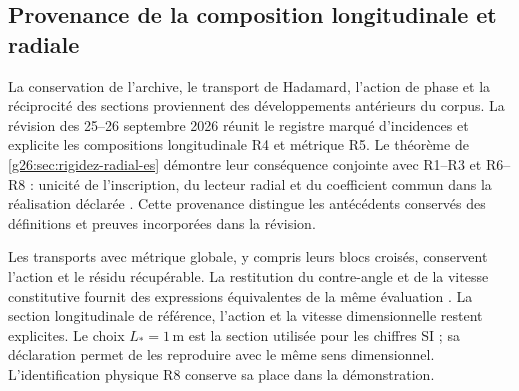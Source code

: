 \subsection{Provenance de la composition longitudinale et radiale}

La conservation de l’archive, le transport de Hadamard, l’action de
phase et la réciprocité des sections proviennent des développements
antérieurs du corpus. La révision des 25--26 septembre 2026
réunit le registre marqué d’incidences et explicite les compositions
longitudinale R4 et métrique R5. Le théorème de
\ref{g26:sec:rigidez-radial-es} démontre leur conséquence conjointe avec
R1--R3 et R6--R8 : unicité de l’inscription, du lecteur radial et du
coefficient commun dans la réalisation déclarée \cite{hmtg26radial}.
Cette provenance distingue les antécédents conservés des
définitions et preuves incorporées dans la révision.

Les transports avec métrique globale, y compris leurs blocs croisés,
conservent l’action et le résidu récupérable. La restitution du
contre-angle et de la vitesse constitutive fournit des expressions
équivalentes de la même évaluation \cite{hmtg26metric,hmtg26counter}.
La section longitudinale de référence, l’action et la vitesse
dimensionnelle restent explicites. Le choix \(L_*=1\,\mathrm m\)
est la section utilisée pour les chiffres SI ; sa déclaration permet
de les reproduire avec le même sens dimensionnel. L’identification
physique R8 conserve sa place dans la démonstration.
